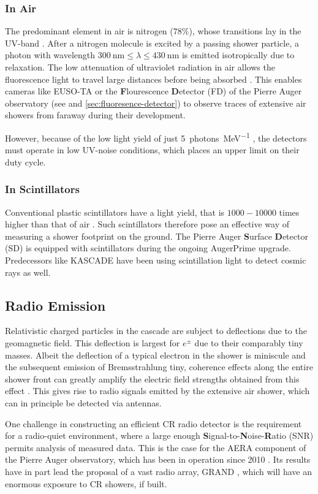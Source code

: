 \subsubsection{In Air}

The predominant element in air is nitrogen ($78\%$), whose transitions lay in the UV-band \cite{FDReconstruction}. After a nitrogen molecule is excited by a passing
shower particle, a photon with wavelength $\SI{300}{\nano\meter} \leq \lambda \leq \SI{430}{\nano\meter}$ is emitted isotropically due to relaxation. The low 
attenuation of ultraviolet radiation in air allows the fluorescence light to travel large distances before being absorbed \cite{elterman1968uv}. This enables 
cameras like EUSO-TA \cite{abdellaoui2018euso} or the \textbf{F}lourescence \textbf{D}etector (FD) of the Pierre Auger observatory (see \cite{FDReconstruction} and
\autoref{sec:fluoresence-detector}) to observe traces of extensive air showers from faraway during their development. 

However, because of the low light yield of just \SI{5}{photons\per\MeV} \cite{nagano2004new}, the detectors must operate in low UV-noise conditions, which 
places an upper limit on their duty cycle.

\subsubsection{In Scintillators}

Conventional plastic scintillators have a light yield, that is $1000-10000$ times higher than that of air \cite{holl1988measurement}. Such scintillators therefore 
pose an effective way of measuring a shower footprint on the ground. The Pierre Auger \textbf{S}urface \textbf{D}etector (SD) is equipped with scintillators during
the ongoing AugerPrime upgrade. Predecessors like KASCADE \cite{Kascade} have been using scintillation light to detect cosmic rays as well.

\subsection{Radio Emission}
\label{ssec:radio-emission}

Relativistic charged particles in the cascade are subject to deflections due to the geomagnetic field. This deflection is largest for $e^\pm$ due to their 
comparably tiny masses. Albeit the deflection of a typical electron in the shower is miniscule and the subsequent emission of Bremsstrahlung tiny, coherence 
effects along the entire shower front can greatly amplify the electric field strengths obtained from this effect \cite{aab2018observation}. This gives rise to radio
signals emitted by the extensive air shower, which can in principle be detected via antennas.

One challenge in constructing an efficient CR radio detector is the requirement for a radio-quiet environment, where a large enough 
\textbf{S}ignal-to-\textbf{N}oise-\textbf{R}atio (SNR) permits analysis of measured data. This is the case for the AERA component of the Pierre Auger observatory,
which has been in operation since 2010 \cite{Aera}. Its results have in part lead the proposal of a vast radio array, GRAND \cite{Grand}, which will have an enormous 
exposure to CR showers, if built.
